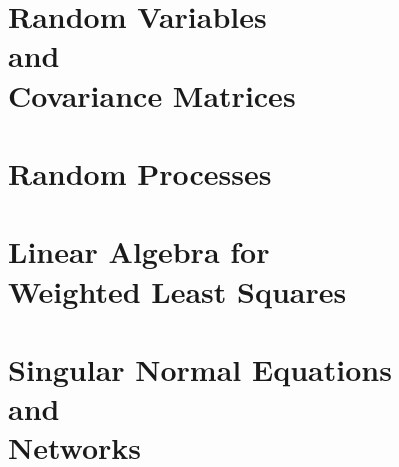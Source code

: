 \documentclass[a4paper,12pt]{book}
\begin{document}
	\chapter{Random Variables \\and\\ Covariance Matrices}
	\minitoc %
	\newpage%
		
		
		
		
		
		
		
		
		
		


	\chapter{Random Processes}
	\minitoc %
	\newpage%
		
		
		
	
		
	\chapter{Linear Algebra for\\ Weighted Least Squares}
	\minitoc %
	\newpage%
		
		
		
		
		
		
		
		

	\chapter{Singular Normal Equations \\and\\ Networks}
	\minitoc %
	\newpage%
		
		
		
		
		
		
		
		
\end{document}
